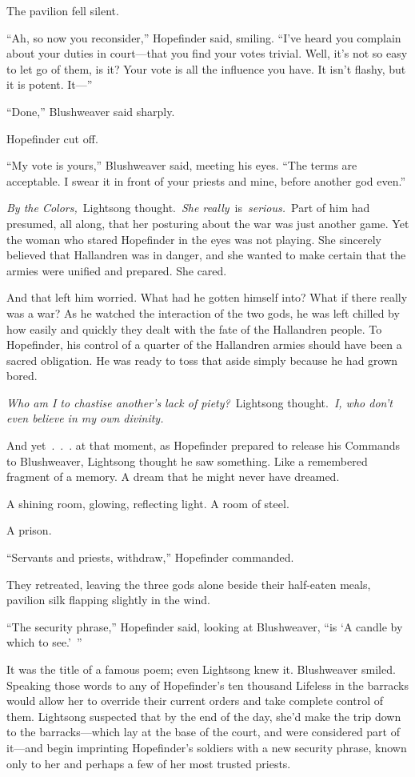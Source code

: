 The pavilion fell silent.

“Ah, so now you reconsider,” Hopefinder said, smiling. “I’ve heard you complain about your duties in court—that you find your votes trivial. Well, it’s not so easy to let go of them, is it? Your vote is all the influence you have. It isn’t flashy, but it is potent. It—”

“Done,” Blushweaver said sharply.

Hopefinder cut off.

“My vote is yours,” Blushweaver said, meeting his eyes. “The terms are acceptable. I swear it in front of your priests and mine, before another god even.”

\textit{By the Colors,}~Lightsong thought.~\textit{She really}~is~\textit{serious.}~Part of him had presumed, all along, that her posturing about the war was just another game. Yet the woman who stared Hopefinder in the eyes was not playing. She sincerely believed that Hallandren was in danger, and she wanted to make certain that the armies were unified and prepared. She cared.

And that left him worried. What had he gotten himself into? What if there really was a war? As he watched the interaction of the two gods, he was left chilled by how easily and quickly they dealt with the fate of the Hallandren people. To Hopefinder, his control of a quarter of the Hallandren armies should have been a sacred obligation. He was ready to toss that aside simply because he had grown bored.

\textit{Who am I to chastise another’s lack of piety?}~Lightsong thought.~\textit{I, who don’t even believe in my own divinity.}

And yet~.~.~. at that moment, as Hopefinder prepared to release his Commands to Blushweaver, Lightsong thought he saw something. Like a remembered fragment of a memory. A dream that he might never have dreamed.

A shining room, glowing, reflecting light. A room of steel.

A prison.

“Servants and priests, withdraw,” Hopefinder commanded.

They retreated, leaving the three gods alone beside their half-eaten meals, pavilion silk flapping slightly in the wind.

“The security phrase,” Hopefinder said, looking at Blushweaver, “is ‘A candle by which to see.’~”

It was the title of a famous poem; even Lightsong knew it. Blushweaver smiled. Speaking those words to any of Hopefinder’s ten thousand Lifeless in the barracks would allow her to override their current orders and take complete control of them. Lightsong suspected that by the end of the day, she’d make the trip down to the barracks—which lay at the base of the court, and were considered part of it—and begin imprinting Hopefinder’s soldiers with a new security phrase, known only to her and perhaps a few of her most trusted priests.

